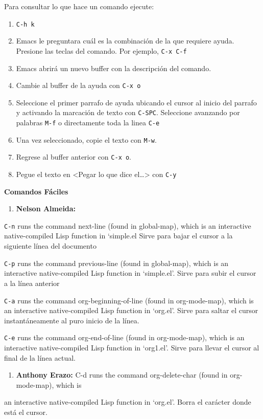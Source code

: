 \documentclass{article}
\begin{document}
Para consultar lo que hace un comando ejecute:
\begin{enumerate}
\item \texttt{C-h k}
\item Emacs le preguntara cuál es la combinación de la que requiere
ayuda. Presione las teclas del comando. Por ejemplo, \texttt{C-x C-f}
\item Emacs abrirá un nuevo buffer con la descripción del comando.
\item Cambie al buffer de la ayuda con \texttt{C-x o}
\item Seleccione el primer parrafo de ayuda ubicando el cursor al inicio
del parrafo y activando la marcación de texto con
\texttt{C-SPC}. Seleccione avanzando por palabras \texttt{M-f} o directamente
toda la linea \texttt{C-e}
\item Una vez seleccionado, copie el texto con \texttt{M-w}.
\item Regrese al buffer anterior con \texttt{C-x o}.
\item Pegue el texto en <Pegar lo que dice el\ldots{}> con \texttt{C-y}
\end{enumerate}

\textbf{\textbf{Comandos Fáciles}}

\begin{enumerate}
\item \textbf{\textbf{Nelson Almeida:}}
\end{enumerate}

\texttt{C-n} runs the command next-line (found in global-map), which is an
interactive native-compiled Lisp function in ‘simple.el
Sirve para bajar el cursor a la siguiente línea del documento

\texttt{C-p} runs the command previous-line (found in global-map), which is an
interactive native-compiled Lisp function in ‘simple.el’.
Sirve para subir el cursor a la línea anterior

\texttt{C-a} runs the command org-beginning-of-line (found in org-mode-map),
which is an interactive native-compiled Lisp function in ‘org.el’.
Sirve para saltar el cursor instantáneamente al puro inicio de la línea.

\texttt{C-e} runs the command org-end-of-line (found in org-mode-map), which is
an interactive native-compiled Lisp function in ‘org1.el’.
Sirve para llevar el cursor al final de la línea actual.

\begin{enumerate}
\item \textbf{\textbf{Anthony Erazo:}}
C-d runs the command org-delete-char (found in org-mode-map), which is
\end{enumerate}
an interactive native-compiled Lisp function in ‘org.el’.
Borra el carácter donde está el cursor.
\end{document}
